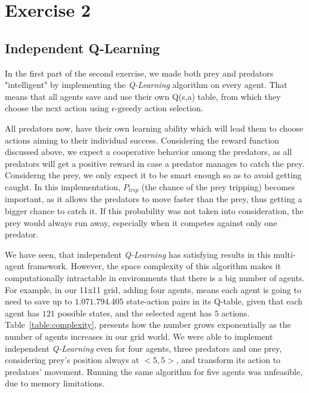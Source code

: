 \documentclass[a4paper,11pt]{article}
\begin{document}
\section{Exercise 2}

\subsection{Independent Q-Learning}
In the first part of the second exercise, we made both prey and predators "intelligent" by implementing the \textit{Q-Learning} algorithm on every agent. That means that all agents save and use their own Q(s,a) table, from which they choose the next action using $\epsilon$-greedy action selection.

All predators now, have their own learning ability which will lead them to choose actions aiming to their individual success. Considering the reward function discussed above, we expect a cooperative behavior among the predators, as all predators will get a positive reward in case a predator manages to catch the prey. Considerng the prey, we only expect it to be smart enough so as to avoid getting caught. In this implementation, $P_{trip}$ (the chance of the prey tripping) becomes important, as it allows the predators to move faster than the prey, thus getting a bigger chance to catch it. If this probability was not taken into consideration, the prey would always run away, especially when it competes against only one predator.


We have seen, that independent \textit{Q-Learning} has satisfying results in this multi-agent framework. However, the space complexity of this algorithm makes it computationally intractable in environments that there is a big number of agents. For example, in our 11x11 grid, adding four agents, means  each agent is going to need to save up to $1.071.794.405$ state-action pairs in its Q-table, given that each agent has $121$ possible states, and the selected agent has $5$ actions. Table~\ref{table:complexity}, presents how the number grows exponentially as the number of agents increases in our grid world. We were able to implement independent \textit{Q-Learning} even for four agents, three predators and one prey, considering prey's position always at $<5,5>$, and transform its action to predators' movement. Running the same algorithm for five agents was unfeasible, due to memory limitations.
\end{document}
